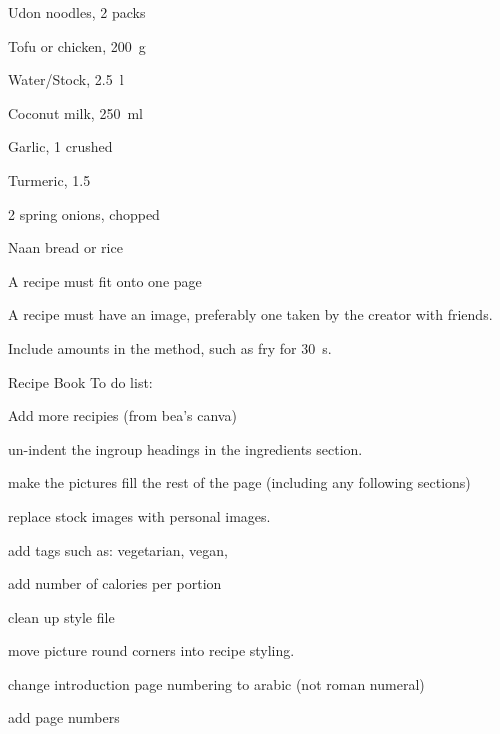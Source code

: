 \label{recipe:test_recipe}


\begin{ingredients}

  \item Udon noodles, 2 packs
  \item Tofu or chicken, \SI{200}{\gram}
  \item Water/Stock, \SI{2.5}{\litre}
  \item Coconut milk, \SI{250}{\milli \litre}
  \item Garlic, \SI{1}{\tablespoon} crushed
  \item Turmeric, \SI{1.5}{\teaspoon}

  \item 2 spring onions, chopped
  \item Naan bread or rice
\end{ingredients}


\begin{method}
  	A recipe must fit onto one page
  
  	A recipe must have an image, preferably one taken by the creator with friends.

  	Include amounts in the method, such as fry for \SI{30}{\second}.

  	Recipe Book To do list:
  
  	Add more recipies (from bea's canva)
  
  	un-indent the ingroup headings in the ingredients section.
  
  	make the pictures fill the rest of the page (including any following sections)

	replace stock images with personal images.
	
	add tags such as: vegetarian, vegan, 
	
	add number of calories per portion
	
	clean up style file
	
	move picture round corners into recipe styling.
	
	change introduction page numbering to arabic (not roman numeral)
	
	add page numbers
  
\end{method}



